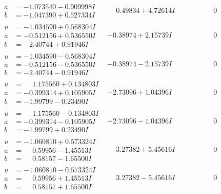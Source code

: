 \documentclass[1p]{elsarticle_modified}
\theoremstyle{definition}
\begin{document}
$$\begin{array}{c|c|c}
\begin{aligned}
a &= -1.073540 - 0.909998 I \\
b &= -1.047390 + 0.527334 I\end{aligned}
 & \phantom{-}0.49834 + 4.72614 I & \phantom{-0.000000 } 0 \\ \hline\begin{aligned}
u &= -1.034590 + 0.568304 I \\
a &= -0.512156 + 0.536550 I \\
b &= -2.40744 + 0.91946 I\end{aligned}
 & -0.38974 + 2.15739 I & \phantom{-0.000000 } 0 \\ \hline\begin{aligned}
u &= -1.034590 - 0.568304 I \\
a &= -0.512156 - 0.536550 I \\
b &= -2.40744 - 0.91946 I\end{aligned}
 & -0.38974 - 2.15739 I & \phantom{-0.000000 } 0 \\ \hline\begin{aligned}
u &= \phantom{-}1.175560 + 0.134803 I \\
a &= -0.399314 + 0.105905 I \\
b &= -1.99799 - 0.23490 I\end{aligned}
 & -2.73096 + 1.04396 I & \phantom{-0.000000 } 0 \\ \hline\begin{aligned}
u &= \phantom{-}1.175560 - 0.134803 I \\
a &= -0.399314 - 0.105905 I \\
b &= -1.99799 + 0.23490 I\end{aligned}
 & -2.73096 - 1.04396 I & \phantom{-0.000000 } 0 \\ \hline\begin{aligned}
u &= -1.060810 + 0.573324 I \\
a &= \phantom{-}0.59956 - 1.45513 I \\
b &= \phantom{-}0.58157 - 1.65500 I\end{aligned}
 & \phantom{-}3.27382 + 5.45616 I & \phantom{-0.000000 } 0 \\ \hline\begin{aligned}
u &= -1.060810 - 0.573324 I \\
a &= \phantom{-}0.59956 + 1.45513 I \\
b &= \phantom{-}0.58157 + 1.65500 I\end{aligned}
 & \phantom{-}3.27382 - 5.45616 I & \phantom{-0.000000 } 0 \\ \hline\begin{aligned}

\end{aligned}
\end{array}$$
\end{document}

